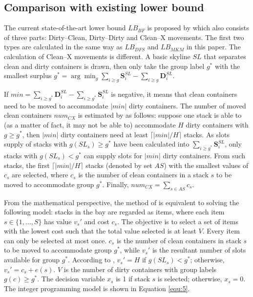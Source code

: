 \documentclass[review,3p,times,authoryear,12pt]{elsarticle}
\begin{document}
\subsection{Comparison with existing lower bound}

The current state-of-the-art lower bound $\mathit{LB}_\mathit{BF}$ is proposed by \cite{BF2012} which also consists of three parts: Dirty--Clean, Dirty--Dirty and Clean--X movements.
The first two types are calculated in the same way as $\mathit{LB}_\mathit{DFS}$ and $\mathit{LB}_\mathit{MKM}$ in this paper. The calculation of Clean--X movements is different.
A basic skyline $\mathit{SL}$ that separates clean and dirty containers is drawn, then \cite{BF2012} only take the group label $g^*$ with the smallest surplus $g^*=\arg\min_g\sum_{i\ge g}\mathbf S^\mathit{SL}_i-\sum_{i\ge g}\mathbf D^\mathit{SL}_i$.

If $\mathit{min}=\sum_{i\ge g^*}\mathbf D^\mathit{SL}_i-\sum_{i\ge g^*}\mathbf S^\mathit{SL}_i$ is negative, it means that clean containers need to be moved to accommodate $|\mathit{min}|$ dirty containers.
The number of moved clean containers $\mathit{num}_\mathit{CX}$ is estimated by \cite{BF2012} as follows: suppose one stack is able to (as a matter of fact, it may not be able to) accommodate $H$ dirty containers with $g\ge g^*$, then $|\mathit{min}|$ dirty containers need at least $\big\lceil{|\mathit{min}|}/{H}\big\rceil$ stacks.
As slots supply of stacks with $g(\mathit{SL}_s)\ge g^*$ have been calculated into $\sum_{i\ge g^*}\mathbf S^\mathit{SL}_i$, only stacks with $g(\mathit{SL}_s)< g^*$ can supply slots for $|\mathit{min}|$ dirty containers.
From such stacks, the first $\big\lceil{|\mathit{min}|}/{H}\big\rceil$ stacks (denoted by set $\mathit{AS}$) with the smallest values of $c_s$ are selected, where $c_s$ is the number of clean containers in a stack $s$ to be moved to accommodate group $g^*$.
Finally, $\mathit{num}_\mathit{CX}=\sum_{s\in \mathit{AS}}c_s$.

From the mathematical perspective, the method of \cite{BF2012} is equivalent to solving the following model: stacks in the bay are regarded as items, where each item $s\in\{1,\dots,S\}$ has value $v_s'$ and cost $c_s$.
The objective is to select a set of items with the lowest cost such that the total value selected is at least $V$.
Every item can only be selected at most once.
$c_s$ is the number of clean containers in stack $s$ to be moved to accommodate group $g^*$, while $v_s'$ is the resultant number of slots available for group $g^*$.
According to \cite{BF2012}, $v_s'=H$ if $g(\mathit{SL}_s)<g^*$; otherwise, $v_s'=c_s+e(s)$.
$V$ is the number of dirty containers with group labels $g(c)\ge g^*$.
The decision variable $x_s$ is 1 if stack $s$ is selected; otherwise, $x_s=0$.
The integer programming model is shown in Equation \ref{equ:5}.
\end{document}
